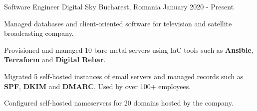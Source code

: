 \begin{cventries}
  \cventry
    {Software Engineer}
    {Digital Sky}
    {Bucharest, Romania}
    {January 2020 - Present}
    {
      \begin{cvitems}
        \item {Managed databases and client-oriented software for television and satellite broadcasting company.}
        \item {Provisioned and managed 10 bare-metal servers using IaC tools such as \textbf{Ansible}, \textbf{Terraform} and \textbf{Digital Rebar}.}
        \item {Migrated 5 self-hosted instances of email servers and managed records such as \textbf{SPF}, \textbf{DKIM} and \textbf{DMARC}. Used by over 100+ employees.}
        \item {Configured self-hosted nameservers for 20 domains hosted by the company.}
      \end{cvitems}
    }
\end{cventries}
